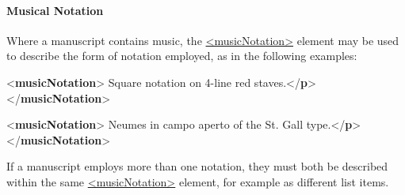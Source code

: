 \paragraph[{Musical Notation}]{Musical Notation}\label{msphmu}\par
Where a manuscript contains music, the \hyperref[TEI.musicNotation]{<musicNotation>} element may be used to describe the form of notation employed, as in the following examples: \par\bgroup{}\exampleFont \begin{shaded}\noindent\mbox{}{<\textbf{musicNotation}>}\mbox{}\newline 
{}Square notation on 4-line red staves.{</\textbf{p}>}\mbox{}\newline 
{</\textbf{musicNotation}>}\end{shaded}\egroup\par \noindent  \par\bgroup{}\exampleFont \begin{shaded}\noindent\mbox{}{<\textbf{musicNotation}>}\mbox{}\newline 
{}Neumes in campo aperto of the St. Gall type.{</\textbf{p}>}\mbox{}\newline 
{</\textbf{musicNotation}>}\end{shaded}\egroup\par \par
If a manuscript employs more than one notation, they must both be described within the same \hyperref[TEI.musicNotation]{<musicNotation>} element, for example as different list items. 
